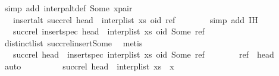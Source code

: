 \begin{isabellebody}
\ {\isacharparenleft}simp\ add{\isacharcolon}\ interp{\isacharunderscore}alt{\isacharunderscore}def\ Some\ x{\isacharunderscore}pair{\isacharparenright}\isanewline
\ \ \ \ \isamarkupfalse%
\ \isamarkupfalse%
\ {\isachardoublequoteopen}{\isachardot}{\isachardot}{\isachardot}\ {\isacharequal}\ insert{\isacharunderscore}alt\ {\isacharparenleft}succ{\isacharunderscore}rel\ {\isacharparenleft}head\ {\isacharhash}\ interp{\isacharunderscore}list\ xs{\isacharparenright}{\isacharparenright}\ {\isacharparenleft}oid{\isacharcomma}\ ref{\isacharparenright}{\isachardoublequoteclose}\isanewline
\ \ \ \ \ \ \isamarkupfalse%
\ {\isacharparenleft}simp\ add{\isacharcolon}\ IH{\isacharparenright}\isanewline
\ \ \ \ \isamarkupfalse%
\ \isamarkupfalse%
\ {\isachardoublequoteopen}{\isachardot}{\isachardot}{\isachardot}\ {\isacharequal}\ succ{\isacharunderscore}rel\ {\isacharparenleft}insert{\isacharunderscore}spec\ {\isacharparenleft}head\ {\isacharhash}\ interp{\isacharunderscore}list\ xs{\isacharparenright}\ {\isacharparenleft}oid{\isacharcomma}\ Some\ ref{\isacharparenright}{\isacharparenright}{\isachardoublequoteclose}\isanewline
\ \ \ \ \ \ \isamarkupfalse%
\ distinct{\isacharunderscore}list\ succ{\isacharunderscore}rel{\isacharunderscore}insert{\isacharunderscore}Some\ \isamarkupfalse%
\ metis\isanewline
\ \ \ \ \isamarkupfalse%
\ \isamarkupfalse%
\ {\isachardoublequoteopen}{\isachardot}{\isachardot}{\isachardot}\ {\isacharequal}\ succ{\isacharunderscore}rel\ {\isacharparenleft}head\ {\isacharhash}\ {\isacharparenleft}insert{\isacharunderscore}spec\ {\isacharparenleft}interp{\isacharunderscore}list\ xs{\isacharparenright}\ {\isacharparenleft}oid{\isacharcomma}\ Some\ ref{\isacharparenright}{\isacharparenright}{\isacharparenright}{\isachardoublequoteclose}\isanewline
\ \ \ \ \ \ \isamarkupfalse%
\ {\isacartoucheopen}ref\ {\isasymnoteq}\ head{\isacartoucheclose}\ \isamarkupfalse%
\ auto\isanewline
\ \ \ \ \isamarkupfalse%
\ \isamarkupfalse%
\ {\isachardoublequoteopen}{\isachardot}{\isachardot}{\isachardot}\ {\isacharequal}\ succ{\isacharunderscore}rel\ {\isacharparenleft}head\ {\isacharhash}\ {\isacharparenleft}interp{\isacharunderscore}list\ {\isacharparenleft}xs\ {\isacharat}\ {\isacharbrackleft}x{\isacharbrackright}{\isacharparenright}{\isacharparenright}{\isacharparenright}{\isachardoublequoteclose}\isanewline
\ \ \ \ \ \ \isamarkupfalse%

\end{isabellebody}
